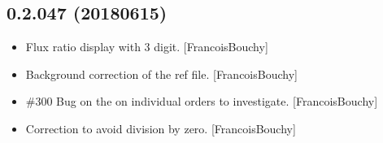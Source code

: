 \documentclass[a4paper,10pt,english]{report}
\begin{document}
\subsection{0.2.047 (2018\sphinxhyphen{}06\sphinxhyphen{}15)}
\label{\detokenize{misc/changelog:id439}}\begin{itemize}
\item {} 
Flux ratio display with 3 digit. {[}FrancoisBouchy{]}

\item {} 
Background correction of the ref file. {[}FrancoisBouchy{]}

\item {} 
\#300 Bug on the  on individual orders to investigate.
{[}FrancoisBouchy{]}

\item {} 
Correction to avoid division by zero. {[}FrancoisBouchy{]}

\end{itemize}
\end{document}
